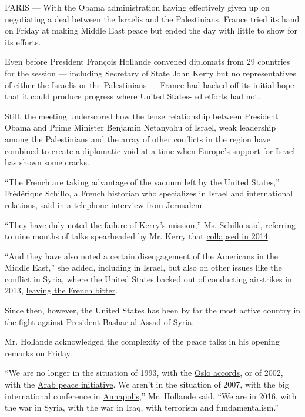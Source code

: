 PARIS --- With the Obama administration having effectively given up on
negotiating a deal between the Israelis and the Palestinians, France
tried its hand on Friday at making Middle East peace but ended the day
with little to show for its efforts.

Even before President François Hollande convened diplomats from 29
countries for the session --- including Secretary of State John Kerry
but no representatives of either the Israelis or the Palestinians ---
France had backed off its initial hope that it could produce progress
where United States-led efforts had not.

Still, the meeting underscored how the tense relationship between
President Obama and Prime Minister Benjamin Netanyahu of Israel, weak
leadership among the Palestinians and the array of other conflicts in
the region have combined to create a diplomatic void at a time when
Europe's support for Israel has shown some cracks.

``The French are taking advantage of the vacuum left by the United
States,'' Frédérique Schillo, a French historian who specializes in
Israel and international relations, said in a telephone interview from
Jerusalem.

``They have duly noted the failure of Kerry's mission,'' Ms. Schillo
said, referring to nine months of talks spearheaded by Mr. Kerry that
\href{http://nyti.ms/1izHQ2L}{collapsed in 2014}.

``And they have also noted a certain disengagement of the Americans in
the Middle East,'' she added, including in Israel, but also on other
issues like the conflict in Syria, where the United States backed out of
conducting airstrikes in 2013,
\href{http://www.nytimes3xbfgragh.onion/2016/02/23/world/europe/laurent-fabius-obama-syria-war.html?_r=0}{leaving
the French bitter}.

Since then, however, the United States has been by far the most active
country in the fight against President Bashar al-Assad of Syria.

Mr. Hollande acknowledged the complexity of the peace talks in his
opening remarks on Friday.

``We are no longer in the situation of 1993, with the
\href{http://www.nytimes3xbfgragh.onion/2015/10/01/world/middleeast/palestinians-mahmoud-abbas-oslo-peace-accords.html}{Oslo
accords}, or of 2002, with the
\href{http://www.nytimes3xbfgragh.onion/2002/03/27/world/mideast-turmoil-arabs-beirut-arab-officials-vow-move-saudi-peace-plan.html}{Arab
peace initiative}. We aren't in the situation of 2007, with the big
international conference in
\href{http://www.nytimes3xbfgragh.onion/2007/11/25/world/middleeast/25annapolis.html}{Annapolis},''
Mr. Hollande said. ``We are in 2016, with the war in Syria, with the war
in Iraq, with terrorism and fundamentalism.''

